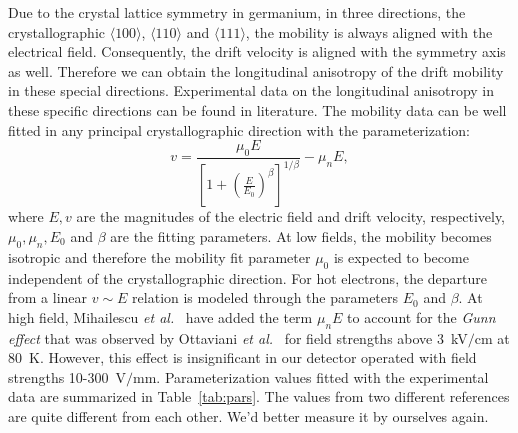 Due to the crystal lattice symmetry in germanium, in three directions, the crystallographic $\langle100\rangle$, $\langle110\rangle$ and $\langle111\rangle$, the mobility is always aligned with the electrical field. Consequently, the drift velocity is aligned with the symmetry axis as well. Therefore we can obtain the longitudinal anisotropy of the drift mobility in these special directions. Experimental data on the longitudinal anisotropy in these specific directions can be found in literature. The mobility data can be well fitted in any principal crystallographic direction with the parameterization:
\begin{equation}
  \label{eq:para}
  v = \frac{\mu_{0}E}{[1+(\frac{E}{E_{0}})^{\beta}]^{1/\beta}} -   \mu_{n}E,
\end{equation}
where $E, v$ are the magnitudes of the electric field and drift velocity, respectively, $\mu_{0}, \mu_{n}, E_{0}$ and $\beta$ are the fitting parameters. At low fields, the mobility becomes isotropic and therefore the mobility fit parameter $\mu_{0}$ is expected to become independent of the crystallographic direction. For hot electrons, the departure from a linear $v \sim E$ relation is modeled through the parameters $E_{0}$ and $\beta$. At high field, Mihailescu \textit{et   al.}~\cite{miha} have added the term $\mu_{n}E$ to account for the \emph{Gunn effect} that was observed by Ottaviani \textit{et   al.}~\cite{otta} for field strengths above 3~kV$/$cm at 80~K. However, this effect is insignificant in our detector operated with field strengths 10-300~V$/$mm. Parameterization values fitted with the experimental data are summarized in Table~\ref{tab:pars}. The values from two different references are quite different from each other. We'd better measure it by ourselves again.

